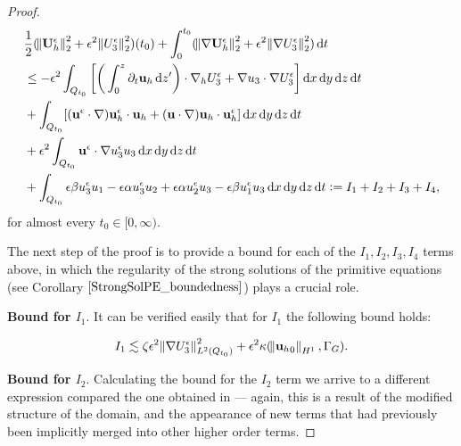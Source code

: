 \documentclass[11pt, a4paper]{article}
\newcommand*\diff{\mathop{}\!\mathrm{d}}
\begin{document}
\begin{proof}
\begin{equation} \label{introduce_I_terms}
\begin{split}
& \frac{1}{2} (\norm{\mathbf{U}_h^\epsilon}_2^2 + \epsilon^2 \norm{U_3^\epsilon}_2^2) (t_0) + \int_0^{t_0} (\norm{\nabla \mathbf{U}_h^\epsilon}_2^2 + \epsilon^2 \norm{\nabla U_3^\epsilon}_2^2) \diff t \\
& \leq - \epsilon^2 \int_{Q_{t_0}} \bigg [ \bigg ( \int_0^z \partial_t \mathbf{u}_h \diff z' \bigg ) \cdot \nabla_h U_3^\epsilon + \nabla u_3 \cdot \nabla U_3^\epsilon \bigg ] \diff x \diff y \diff z \diff t \\
& + \int_{Q_{t_0}} [(\mathbf{u}^\epsilon \cdot \nabla) \mathbf{u}_h^\epsilon \cdot \mathbf{u}_h + (\mathbf{u} \cdot \nabla )\mathbf{u}_h \cdot \mathbf{u}_h^\epsilon] \diff x \diff y \diff z \diff t \\
& + \epsilon^2 \int_{Q_{t_0}} \mathbf{u}^\epsilon \cdot \nabla u_3^\epsilon u_3 \diff x \diff y \diff z \diff t \\
& + \int_{Q_{t_0}} \epsilon \beta u_3^\epsilon u_1 - \epsilon \alpha u_3^\epsilon u_2 + \epsilon \alpha u_2^\epsilon u_3 - \epsilon \beta u_1^\epsilon u_3 \diff x \diff y \diff z \diff t := I_1 + I_2 + I_3 + I_4, \raisetag{80pt}
\end{split}
\end{equation}
%
for almost every $t_0 \in [0, \infty).$

The next step of the proof is to provide a bound for each of the $I_1, I_2, I_3, I_4$ terms above, in which the regularity of the strong solutions of the primitive equations (see Corollary $\ref{StrongSolPE_boundedness}$) plays a crucial role.

\textbf{Bound for $I_1.$} It can be verified easily that for $I_1$ the following bound holds:

$$ I_1 \lesssim \zeta \epsilon^2 \norm{\nabla U_3^\epsilon}^2_{L^2(Q_{t_0})} + \epsilon^2 \kappa (\norm{{\mathbf{u}_h}_0}_{H^1}, \Gamma_G). $$

\textbf{Bound for $I_2.$} Calculating the bound for the $I_2$ term we arrive to a different expression compared the one obtained in \cite{li2019primitive} --- again, this is a result of the modified structure of the domain, and the appearance of new terms that had previously been implicitly merged into other higher order terms. 


\end{proof}
\end{document}
